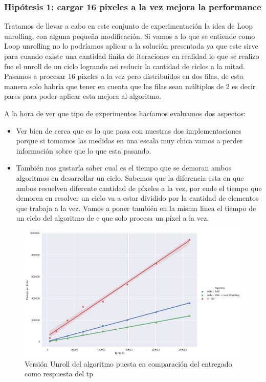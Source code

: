 \subsubsection*{Hipótesis 1: cargar 16 pixeles a la vez mejora la performance}
Tratamos de llevar a cabo en este conjunto de experimentación la idea de Loop unrolling, con alguna pequeña modificación. Si vamos a lo que se entiende como Loop unrolling no lo podríamos aplicar a la solución presentada ya que este sirve para cuando existe una cantidad finita de iteraciones en realidad lo que se realizo fue el unroll de un ciclo logrando asi reducir la cantidad de ciclos a la mitad. Pasamos a procesar 16 pixeles a la vez pero distribuidos en dos filas, de esta manera solo habría que tener en cuenta que las filas sean múltiplos de 2 es decir pares para poder aplicar esta mejora al algoritmo.

A la hora de ver que tipo de experimentos hacíamos evaluamos dos aspectos:
\begin{itemize}
\item Ver bien de cerca que es lo que pasa con nuestras dos implementaciones porque si tomamos las medidas en una escala muy chica vamos a perder información sobre que lo que esta pasando. 

\item También nos gustaría saber cual es el tiempo que se demoran ambos algoritmos en desarrollar un ciclo. Sabemos que la diferencia esta en que ambos resuelven diferente cantidad de  píxeles a la vez, por ende el tiempo que demoren en resolver un ciclo va a estar dividido por la cantidad de elementos que trabaja a la vez. Vamos a poner también en la misma linea el tiempo de un ciclo del algoritmo de c que solo procesa un píxel a la vez.
\end{itemize}
\begin{figure}[H]
	\centering
	\includegraphics[scale=0.5]{img/fourCombine_UnrollvsNormal.png}
	\caption{Versión Unroll del algoritmo puesta en comparación del entregado como respuesta del tp}
	\label{fourCombine_unroolvsnormal}
\end{figure}

